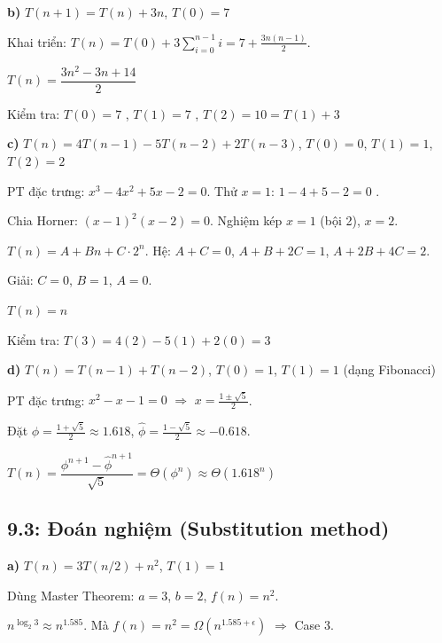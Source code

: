 \documentclass[12pt,a4paper]{article}
\begin{document}
\textbf{b)} $T(n+1) = T(n) + 3n$, $T(0) = 7$

Khai triển: $T(n) = T(0) + 3\sum_{i=0}^{n-1}i = 7 + \frac{3n(n-1)}{2}$.

\begin{resultbox}
$T(n) = \dfrac{3n^2 - 3n + 14}{2}$

Kiểm tra: $T(0) = 7$ \checkmark, $T(1) = 7$ \checkmark, $T(2) = 10 = T(1) + 3$ \checkmark
\end{resultbox}

\bigskip

\textbf{c)} $T(n) = 4T(n-1) - 5T(n-2) + 2T(n-3)$, $T(0)=0$, $T(1)=1$, $T(2)=2$

PT đặc trưng: $x^3 - 4x^2 + 5x - 2 = 0$. Thử $x=1$: $1-4+5-2=0$ \checkmark.

Chia Horner: $(x-1)^2(x-2) = 0$. Nghiệm kép $x=1$ (bội 2), $x=2$.

$T(n) = A + Bn + C \cdot 2^n$. Hệ: $A+C = 0$, $A+B+2C = 1$, $A+2B+4C = 2$.

Giải: $C = 0$, $B = 1$, $A = 0$.

\begin{resultbox}
$T(n) = n$

Kiểm tra: $T(3) = 4(2)-5(1)+2(0) = 3$ \checkmark
\end{resultbox}

\bigskip

\textbf{d)} $T(n) = T(n-1) + T(n-2)$, $T(0) = 1$, $T(1) = 1$ (dạng Fibonacci)

PT đặc trưng: $x^2 - x - 1 = 0$ $\Rightarrow$ $x = \frac{1 \pm \sqrt{5}}{2}$.

Đặt $\phi = \frac{1+\sqrt{5}}{2} \approx 1.618$, $\hat\phi = \frac{1-\sqrt{5}}{2} \approx -0.618$.

\begin{resultbox}
$T(n) = \dfrac{\phi^{n+1} - \hat\phi^{n+1}}{\sqrt{5}} = \Theta(\phi^n) \approx \Theta(1.618^n)$
\end{resultbox}

\subsection{9.3: Đoán nghiệm (Substitution method)}

\textbf{a)} $T(n) = 3T(n/2) + n^2$, $T(1) = 1$

Dùng Master Theorem: $a = 3$, $b = 2$, $f(n) = n^2$.

$n^{\log_2 3} \approx n^{1.585}$. Mà $f(n) = n^2 = \Omega(n^{1.585+\epsilon})$ $\Rightarrow$ Case 3.
\end{document}
